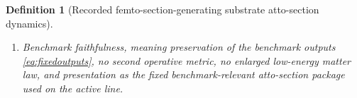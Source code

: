 \documentclass[11pt]{article}
\newcommand{\FemtoSectionShell}[1]{\mathcal Z_{#1}^{\mathrm{femtosec}}}
\newcommand{\AttoSectionProj}[1]{\Pi_{#1}^{\mathrm{attosec}}}
\newcommand{\AttoSectionFiber}[2]{\mathcal F_{#1}^{\mathrm{attosec}}(#2)}
\newcommand{\AttoSectionFunctional}[1]{\mathscr A_{#1}^{\mathrm{attosec}}}
\newcommand{\AttoSectionShell}[1]{\mathcal Z_{#1}^{\mathrm{attosec}}}
\newtheorem{definition}{Definition}
\begin{document}
\begin{definition}[Recorded femto-section-generating substrate atto-section dynamics]
\begin{enumerate}
\[\begin{array}{l}
    \AttoSectionFunctional{\sigma}(v)
    =
    \displaystyle\min_{w\in\AttoSectionFiber{\sigma}{\AttoSectionProj{\sigma}(v)}}
    \AttoSectionFunctional{\sigma}(w)
    \end{array}
    \right\},
    \]
    and
    \[
    \AttoSectionProj{\sigma}\big|_{\AttoSectionShell{\sigma}}
    :
    \AttoSectionShell{\sigma}
    \xrightarrow{\cong}
    \FemtoSectionShell{\sigma}
    \]
    is a diffeomorphism.
    \item Benchmark faithfulness, meaning preservation of the benchmark outputs \eqref{eq:fixedoutputs}, no second operative metric, no enlarged low-energy matter law, and presentation as the fixed benchmark-relevant atto-section package used on the active line.
\end{enumerate}
\end{definition}
\end{document}
